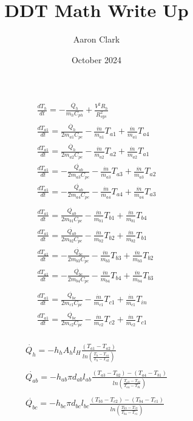 \documentclass[16pt]{article}
\title{DDT Math Write Up}
\author{Aaron Clark}
\date{October 2024}
\begin{document}
\maketitle
\Large
\pagebreak

\huge
\[\begin{matrix}
    \frac{dT_{h}}{dt}=-\frac{\dot{Q_{h}}}{m_{h}C_{ph}}+\frac{V^2R_{h}}{R_{sys}^2}
    \\
    \frac{dT_{a1}}{dt}=\frac{\dot{Q_{h}}}{2m_{a1}C_{pc}}-\frac{\dot{m}}{m_{a1}}T_{a1}+\frac{\dot{m}}{m_{a1}}T_{a4}\\
    \frac{dT_{a1}}{dt}=\frac{\dot{Q_{h}}}{2m_{a2}C_{pc}}-\frac{\dot{m}}{m_{a2}}T_{a2}+\frac{\dot{m}}{m_{a2}}T_{a1}\\
    \frac{dT_{a1}}{dt}=-\frac{\dot{Q_{ab}}}{2m_{a3}C_{pc}}-\frac{\dot{m}}{m_{a3}}T_{a3}+\frac{\dot{m}}{m_{a3}}T_{a2}\\
    \frac{dT_{a1}}{dt}=-\frac{\dot{Q_{ab}}}{2m_{a4}C_{pc}}-\frac{\dot{m}}{m_{a4}}T_{a4}+\frac{\dot{m}}{m_{a4}}T_{a3}\\
    \\
    \frac{dT_{a1}}{dt}=\frac{\dot{Q_{ab}}}{2m_{b1}C_{pc}}-\frac{\dot{m}}{m_{b1}}T_{b1}+\frac{\dot{m}}{m_{b1}}T_{b4}\\
    \frac{dT_{a1}}{dt}=\frac{\dot{Q_{ab}}}{2m_{b2}C_{pc}}-\frac{\dot{m}}{m_{b2}}T_{b2}+\frac{\dot{m}}{m_{b2}}T_{b1}\\
    \frac{dT_{a1}}{dt}=-\frac{\dot{Q_{bc}}}{2m_{b3}C_{pc}}-\frac{\dot{m}}{m_{b3}}T_{b3}+\frac{\dot{m}}{m_{b3}}T_{b2}\\
    \frac{dT_{a1}}{dt}=-\frac{\dot{Q_{bc}}}{2m_{b4}C_{pc}}-\frac{\dot{m}}{m_{b4}}T_{b4}+\frac{\dot{m}}{m_{b4}}T_{b3}\\
    \\
    \frac{dT_{a1}}{dt}=\frac{\dot{Q_{bc}}}{2m_{c1}C_{pc}}-\frac{\dot{m}}{m_{c1}}T_{c1}+\frac{\dot{m}}{m_{c1}}T_{in}\\
    \frac{dT_{a1}}{dt}=\frac{\dot{Q_{bc}}}{2m_{c2}C_{pc}}-\frac{\dot{m}}{m_{c2}}T_{c2}+\frac{\dot{m}}{m_{c2}}T_{c1}\\
\end{matrix}\]
\pagebreak

\[\begin{matrix}
    \dot{Q_{h}}=-h_{h}A_{h}l_{H}\frac{(T_{a1}-T_{a2})}{ln(\frac{T_{h}-T_{a1}}{T_{h}-T_{a2}})}\\
    \\
    \dot{Q_{ab}}=-h_{ab}\pi d_{ab}l_{ab}\frac{(T_{a3}-T_{b2})-(T_{a4}-T_{b1})}{ln(\frac{T_{a3}-T_{b2}}{T_{a4}-T_{b1}})}\\
    \\
    \dot{Q_{bc}}=-h_{bc}\pi d_{bc}l_{bc}\frac{(T_{b3}-T_{c2})-(T_{b4}-T_{c1})}{ln(\frac{T_{b3}-T_{c2}}{T_{b4}-T_{c1}})}\\
\end{matrix}\]
\end{document}
